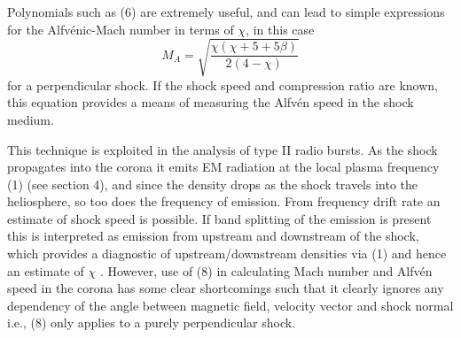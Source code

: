 Polynomials such as (6) are extremely useful, and can lead to simple expressions for the Alfv\'{e}nic-Mach number in terms of $\chi$, in this case
\begin{equation}
M_{A}=\sqrt{\frac{\chi(\chi+5+5\beta)}{2(4-\chi)}} 
\end{equation}
for a perpendicular shock. If the shock speed and compression ratio are known, this equation provides a means of measuring the Alfv\'{e}n speed in the shock medium. 

This technique is exploited in the analysis of type II radio bursts. As the shock propagates into the corona it emits EM radiation at the local plasma frequency (1) (see section 4), and since the density drops as the shock travels into the heliosphere, so too does the frequency of emission. From frequency drift rate an estimate of shock speed is possible. If band splitting of the emission is present this is interpreted as emission from upstream and downstream of the shock, which provides a diagnostic of upstream/downstream densities via (1) and hence an estimate of $\chi$ \citep{vrsnak2002}. However, use of (8) in calculating Mach number and Alfv\'{e}n speed in the corona has some clear shortcomings such that it clearly ignores any dependency of the angle between magnetic field, velocity vector and shock normal i.e., (8) only applies to a purely perpendicular shock.

